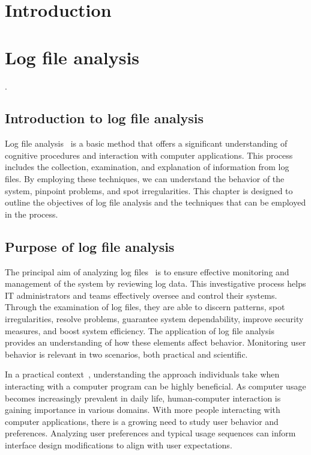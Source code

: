 \chapter{Introduction}
\label{chap:introduction}


\chapter{Log file analysis}
\label{chap:log-analysis}
.

\section{Introduction to log file analysis}
\label{sec:intro-analysis}
Log file analysis~\cite{hulshof2005logfile} is a basic method that offers a significant understanding of cognitive procedures and interaction with computer applications. This process includes the collection, examination, and explanation of information from log files. By employing these techniques, we can understand the behavior of the system, pinpoint problems, and spot irregularities. This chapter is designed to outline the objectives of log file analysis and the techniques that can be employed in the process.

\section{Purpose of log file analysis}
\label{sec:purpose}
The principal aim of analyzing log files~\cite{aivalis2020logfile} is to ensure effective monitoring and management of the system by reviewing log data. This investigative process helps IT administrators and teams effectively oversee and control their systems. Through the examination of log files, they are able to discern patterns, spot irregularities, resolve problems, guarantee system dependability, improve security measures, and boost system efficiency. The application of log file analysis provides an understanding of how these elements affect behavior. Monitoring user behavior is relevant in two scenarios, both practical and scientific.

In a practical context~\cite{hulshof2005logfile}, understanding the approach individuals take when interacting with a computer program can be highly beneficial. As computer usage becomes increasingly prevalent in daily life, human-computer interaction is gaining importance in various domains. With more people interacting with computer applications, there is a growing need to study user behavior and preferences. Analyzing user preferences and typical usage sequences can inform interface design modifications to align with user expectations.

